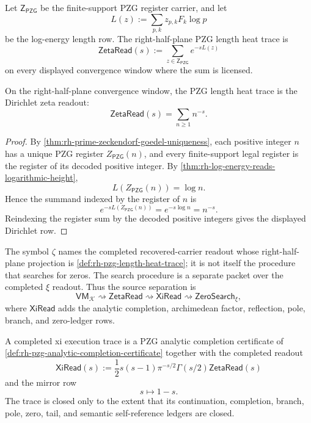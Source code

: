 \begin{definition}
\label{def:rh-pzg-length-heat-trace}
Let $\mathsf Z_{\mathsf{PZG}}$ be the finite-support PZG register
carrier, and let
$$
L(z):=\sum_{p,k}z_{p,k}F_k\log p
$$
be the log-energy length row.  The right-half-plane PZG length heat
trace is
$$
\mathsf{ZetaRead}(s)
:=
\sum_{z\in\mathsf Z_{\mathsf{PZG}}}e^{-sL(z)}
$$
on every displayed convergence window where the sum is licensed.
\end{definition}

\begin{theorem}
\label{thm:rh-pzg-heat-trace-dirichlet-zeta-readout}
On the right-half-plane convergence window, the PZG length heat trace is
the Dirichlet zeta readout:
$$
\mathsf{ZetaRead}(s)=\sum_{n\geq1}n^{-s}.
$$
\end{theorem}

\begin{proof}
By \autoref{thm:rh-prime-zeckendorf-goedel-uniqueness}, each positive
integer $n$ has a unique PZG register $Z_{\mathsf{PZG}}(n)$, and every
finite-support legal register is the register of its decoded positive
integer.  By \autoref{thm:rh-log-energy-reads-logarithmic-height},
$$
L(Z_{\mathsf{PZG}}(n))=\log n.
$$
Hence the summand indexed by the register of $n$ is
$$
e^{-sL(Z_{\mathsf{PZG}}(n))}
=
e^{-s\log n}
=
n^{-s}.
$$
Reindexing the register sum by the decoded positive integers gives the
displayed Dirichlet row.
\end{proof}

\begin{principle}
\label{prin:rh-zeta-readout-not-search-program}
The symbol $\zeta$ names the completed recovered-carrier readout whose
right-half-plane projection is
\autoref{def:rh-pzg-length-heat-trace}; it is not itself the procedure
that searches for zeros.  The search procedure is a separate packet over
the completed $\xi$ readout.  Thus the source separation is
$$
\mathsf{VM}_{\mathcal K}
\rightsquigarrow
\mathsf{ZetaRead}
\rightsquigarrow
\mathsf{XiRead}
\rightsquigarrow
\mathsf{ZeroSearch}_{\xi},
$$
where $\mathsf{XiRead}$ adds the analytic completion, archimedean factor,
reflection, pole, branch, and zero-ledger rows.
\end{principle}

\begin{definition}
\label{def:rh-completed-xi-execution-trace}
A completed xi execution trace is a PZG analytic completion certificate
of \autoref{def:rh-pzg-analytic-completion-certificate} together with
the completed readout
$$
\mathsf{XiRead}(s)
:=
\frac12 s(s-1)\pi^{-s/2}\Gamma(s/2)\mathsf{ZetaRead}(s)
$$
and the mirror row
$$
s\mapsto 1-s.
$$
The trace is closed only to the extent that its continuation, completion,
branch, pole, zero, tail, and semantic self-reference ledgers are closed.
\end{definition}

